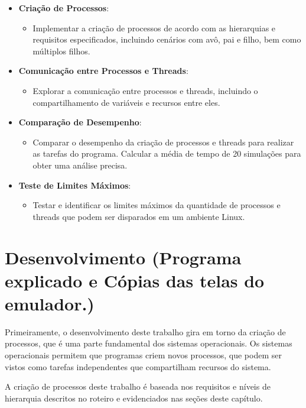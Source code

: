 \documentclass[
	12pt,				%
	openright,			%
	oneside,			%
	a4paper,			%
	chapter=TITLE,		%
	english,			%
	french,				%
	spanish,			%
	brazil				%
	]{abntex2}
\theoremstyle{definition}
\begin{document}
\begin{itemize}
    \item \textbf{Criação de Processos}:
    \begin{itemize}
        \item Implementar a criação de processos de acordo com as hierarquias e requisitos especificados, incluindo cenários com avô, pai e filho, bem como múltiplos filhos.
    \end{itemize}

    \item \textbf{Comunicação entre Processos e Threads}:
    \begin{itemize}
        \item Explorar a comunicação entre processos e threads, incluindo o compartilhamento de variáveis e recursos entre eles.
    \end{itemize}

    \item \textbf{Comparação de Desempenho}:
    \begin{itemize}
        \item Comparar o desempenho da criação de processos e threads para realizar as tarefas do programa. Calcular a média de tempo de 20 simulações para obter uma análise precisa.
    \end{itemize}

    \item \textbf{Teste de Limites Máximos}:
    \begin{itemize}
        \item Testar e identificar os limites máximos da quantidade de processos e threads que podem ser disparados em um ambiente Linux. 
    \end{itemize}
\end{itemize}

  

\chapter{Desenvolvimento (Programa explicado e Cópias das telas do emulador.)}

Primeiramente, o desenvolvimento deste trabalho gira em torno da criação
de processos, que é uma parte fundamental dos sistemas operacionais. 
Os sistemas operacionais permitem que programas criem novos processos, que 
podem ser vistos como tarefas independentes que compartilham recursos do sistema. 

A criação de processos deste trabalho é baseada nos requisitos e níveis de hierarquia descritos 
no roteiro e evidenciados nas seções deste capítulo.
\end{document}
